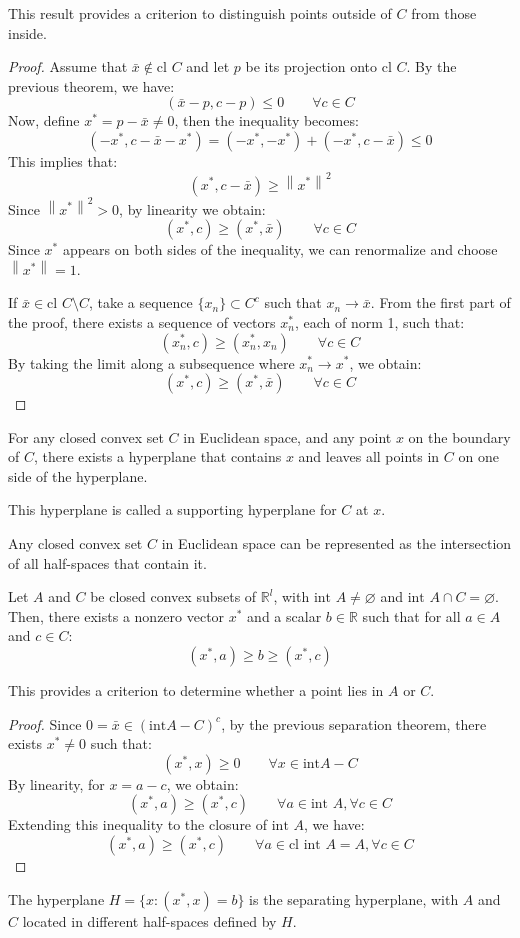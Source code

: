 This result provides a criterion to distinguish points outside of $C$ from those inside.
\begin{proof}
    Assume that $\bar{x} \notin \text{cl } C$ and let $p$ be its projection onto $\text{cl } C$. 
    By the previous theorem, we have:
    \[(\bar{x} - p, c - p) \leq 0 \qquad \forall c \in C\]
    Now, define $x^\ast = p - \bar{x} \neq 0$, then the inequality becomes:
    \[(-x^\ast, c - \bar{x} - x^\ast) =(-x^\ast, -x^\ast) + (-x^\ast, c - \bar{x}) \leq 0\]
    This implies that:
    \[(x^\ast, c - \bar{x}) \geq \left\lVert x^\ast\right\rVert^2\]
    Since $\left\lVert x^\ast\right\rVert^2> 0$, by linearity we obtain:
    \[(x^\ast, c) \geq (x^\ast, \bar{x}) \qquad \forall c \in C\]
    Since $x^\ast$ appears on both sides of the inequality, we can renormalize and choose $\left\lVert x^\ast\right\rVert = 1$. 

    If $\bar{x} \in \text{cl }C \setminus C$, take a sequence $\{x_n\} \subset C^c$ such that $x_n \rightarrow \bar{x}$. 
    From the first part of the proof, there exists a sequence of vectors $x^\ast_n$, each of norm 1, such that:
    \[(x^\ast_n, c) \geq (x^\ast_n, x_n) \qquad \forall c \in C\]
    By taking the limit along a subsequence where $x^\ast_n \rightarrow x^\ast$, we obtain:
    \[(x^\ast, c) \geq (x^\ast, \bar{x}) \qquad \forall c \in C\]
\end{proof}
\begin{corollary}
    For any closed convex set $C$ in Euclidean space, and any point $x$ on the boundary of $C$, there exists a hyperplane that contains $x$ and leaves all points in $C$ on one side of the hyperplane.
\end{corollary}
This hyperplane is called a supporting hyperplane for $C$ at $x$.
\begin{corollary}
    Any closed convex set $C$ in Euclidean space can be represented as the intersection of all half-spaces that contain it.
\end{corollary}
\begin{theorem}
    Let $A$ and $C$ be closed convex subsets of $\mathbb{R}^l$, with $\text{int } A \neq\varnothing$ and $\text{int }A \cap C = \varnothing$. 
    Then, there exists a nonzero vector $x^\ast$ and a scalar $b \in \mathbb{R}$ such that for all $a \in A$ and $c \in C$:
    \[(x^\ast, a) \geq b \geq (x^\ast, c)\]
\end{theorem}
This provides a criterion to determine whether a point lies in $A$ or $C$.
\begin{proof}
    Since $0=\bar{x} \in (\text{int}A - C)^c$, by the previous separation theorem, there exists $x^\ast \neq 0$ such that:
    \[(x^\ast, x) \geq 0 \qquad \forall x \in \text{int}A - C\]
    By linearity, for $x = a - c$, we obtain:
    \[(x^\ast, a) \geq (x^\ast, c) \qquad \forall a \in \text{int }A , \forall c \in C\]
    Extending this inequality to the closure of $\text{int }A$, we have:
    \[(x^\ast, a) \geq (x^\ast, c) \qquad \forall a \in \text{cl } \text{int }A = A , \forall c \in C\]
\end{proof}
The hyperplane $H = \{x : (x^\ast, x) = b\}$  is the separating hyperplane, with $A$ and $C$ located in different half-spaces defined by $H$.